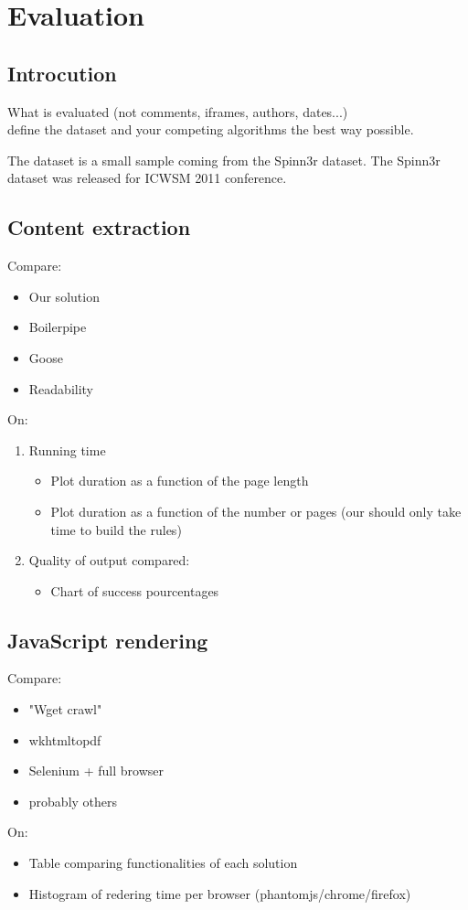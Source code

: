 \section{Evaluation}

\subsection{Introcution}
What is evaluated (not comments, iframes, authors, dates...)
\\ define the dataset and your competing algorithms the best way possible.

The dataset is a small sample coming from the Spinn3r dataset. The Spinn3r dataset was released for ICWSM 2011 conference.

\subsection{Content extraction}
Compare:
\begin{itemize}
  \item Our solution
  \item Boilerpipe 
  \item Goose 
  \item Readability 
\end{itemize}
On:
\begin{enumerate}
  \item Running time
  \begin{itemize}
    \item Plot duration as a function of the page length
    \item Plot duration as a function of the number or pages (our should only take time to build the rules)
  \end{itemize}
  \item Quality of output compared:
  \begin{itemize}
    \item Chart of success pourcentages
  \end{itemize}
\end{enumerate}

\subsection{JavaScript rendering}
Compare:
\begin{itemize}
  \item "Wget crawl" 
  \item wkhtmltopdf 
  \item Selenium + full browser
  \item probably others
\end{itemize}
On:
\begin{itemize}
  \item Table comparing functionalities of each solution
  \item Histogram of redering time per browser (phantomjs/chrome/firefox)
\end{itemize}
